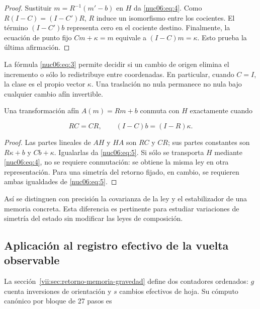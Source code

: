 \begin{proof}
Sustituir \(m=R^{-1}(m'-b)\) en \(H\) da \eqref{nuc06:eq:4}. Como \(R(I-C)=(I-C')R\), \(R\) induce un isomorfismo entre los cocientes. El término \((I-C')b\) representa cero en el cociente destino. Finalmente, la ecuación de punto fijo \(Cm+\kappa=m\) equivale a \((I-C)m=\kappa\). Esto prueba la última afirmación.
\end{proof}

La fórmula \eqref{nuc06:eq:3} permite decidir si un cambio de origen elimina el incremento o sólo lo redistribuye entre coordenadas. En particular, cuando \(C=I\), la clase es el propio vector \(\kappa\). Una traslación no nula permanece no nula bajo cualquier cambio afín invertible.

\begin{proposition}

Una transformación afín \(A(m)=Rm+b\) conmuta con \(H\) exactamente cuando

\begin{equation}
RC=CR,\qquad (I-C)b=(I-R)\kappa.
\label{nuc06:eq:5}
\end{equation}
\end{proposition}

\begin{proof}
Las partes lineales de \(AH\) y \(HA\) son \(RC\) y \(CR\); sus partes constantes son \(R\kappa+b\) y \(Cb+\kappa\). Igualarlas da \eqref{nuc06:eq:5}. Si sólo se transporta \(H\) mediante \eqref{nuc06:eq:4}, no se requiere conmutación: se obtiene la misma ley en otra representación. Para una simetría del retorno fijado, en cambio, se requieren ambas igualdades de \eqref{nuc06:eq:5}.
\end{proof}

Así se distinguen con precisión la covarianza de la ley y el estabilizador de una memoria concreta. Esta diferencia es pertinente para estudiar variaciones de simetría del estado sin modificar las leyes de composición.

\subsection{Aplicación al registro efectivo de la vuelta observable}

La sección~\ref{vii:sec:retorno-memoria-gravedad} define dos contadores ordenados: \(g\) cuenta inversiones de orientación y \(s\) cambios efectivos de hoja. Su cómputo canónico por bloque de 27 pasos es

